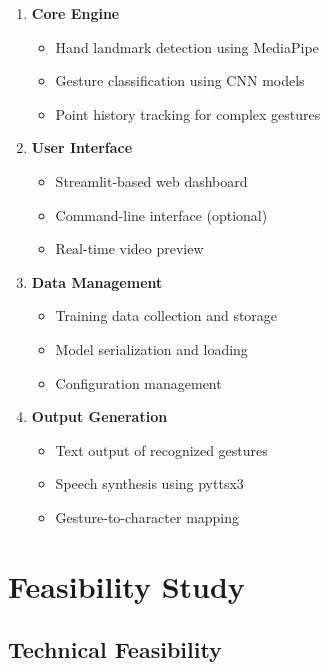 \begin{enumerate}
    \item \textbf{Core Engine}
    \begin{itemize}
        \item Hand landmark detection using MediaPipe
        \item Gesture classification using CNN models
        \item Point history tracking for complex gestures
    \end{itemize}
    
    \item \textbf{User Interface}
    \begin{itemize}
        \item Streamlit-based web dashboard
        \item Command-line interface (optional)
        \item Real-time video preview
    \end{itemize}
    
    \item \textbf{Data Management}
    \begin{itemize}
        \item Training data collection and storage
        \item Model serialization and loading
        \item Configuration management
    \end{itemize}
    
    \item \textbf{Output Generation}
    \begin{itemize}
        \item Text output of recognized gestures
        \item Speech synthesis using pyttsx3
        \item Gesture-to-character mapping
    \end{itemize}
\end{enumerate}

\section{Feasibility Study}

\subsection{Technical Feasibility}

